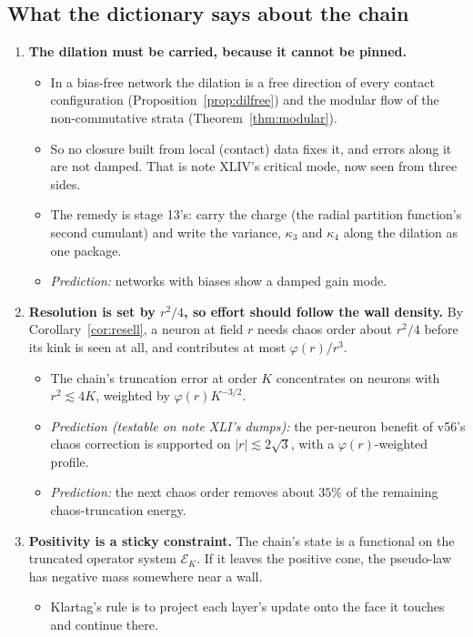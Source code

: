 \label{sec:chain}
\subsection{What the dictionary says about the chain}
\begin{enumerate}[leftmargin=*]
\item \textbf{The dilation must be carried, because it cannot be pinned.}
\begin{itemize}
\item In a bias-free network the dilation is a free direction of every contact configuration (Proposition~\ref{prop:dilfree}) and the
modular flow of the non-commutative strata (Theorem~\ref{thm:modular}).
\item So no closure built from local (contact) data fixes it, and errors along it are not damped. That is note XLIV's critical mode,
now seen from three sides.
\item The remedy is stage 13's: carry the charge (the radial partition function's second cumulant) and write the variance, $\kappa_3$ and
$\kappa_4$ along the dilation as one package.
\item \emph{Prediction:} networks with biases show a damped gain mode.
\end{itemize}
\item \textbf{Resolution is set by $r^2/4$, so effort should follow the wall density.} By Corollary~\ref{cor:resell}, a neuron at field $r$ needs chaos
order about $r^2/4$ before its kink is seen at all, and contributes at most $\varphi(r)/r^3$.
\begin{itemize}
\item The chain's truncation error at order $K$ concentrates on neurons with $r^2\lesssim4K$, weighted by $\varphi(r)K^{-3/2}$.
\item \emph{Prediction (testable on note XLI's dumps):} the per-neuron benefit of v56's chaos correction is supported on $|r|\lesssim2\sqrt3$,
with a $\varphi(r)$-weighted profile.
\item \emph{Prediction:} the next chaos order removes about $35\%$ of the remaining chaos-truncation energy.
\end{itemize}
\item \textbf{Positivity is a sticky constraint.} The chain's state is a functional on the truncated operator system $\mathcal E_K$. If it
leaves the positive cone, the pseudo-law has negative mass somewhere near a wall.
\begin{itemize}
\item Klartag's rule is to project each layer's update onto the face it touches and continue there.

\end{itemize}
\end{enumerate}
